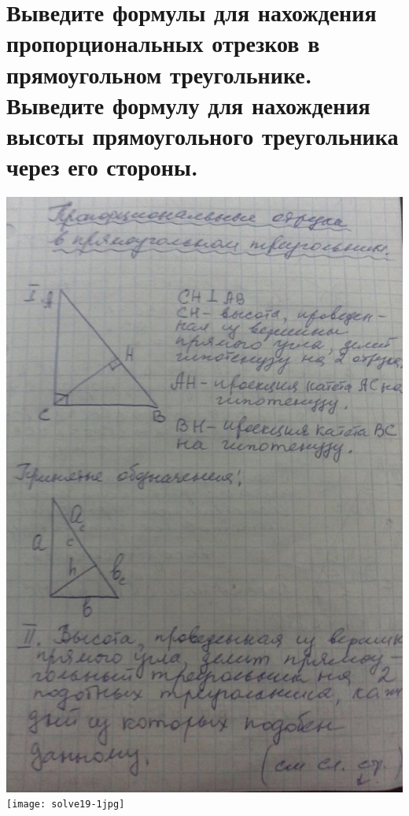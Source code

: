 \documentclass[12pt, letterpaper]{article}
\begin{document}
\section {Выведите формулы для нахождения пропорциональных отрезков в прямоугольном треугольнике. Выведите формулу для нахождения высоты прямоугольного треугольника через его стороны.}
\includegraphics[scale=0.3]{solve19.jpg} \\
\texttt{[image: solve19-1jpg]} \\
\end{document}
